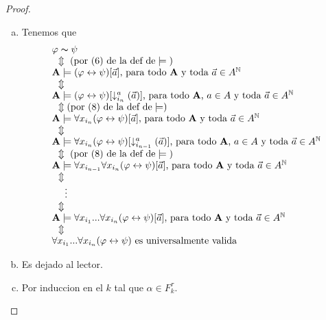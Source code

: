   \begin{proof}
    \begin{enumerate}[(a)]
      \item Tenemos que
        \[
          \begin{array}{l}
            \varphi \thicksim \psi \\
            \ \ \Updownarrow \text{ (por (6) de la def de}\models \text{)} \\
            \mathbf{A} \models (\varphi \leftrightarrow \psi )[\vec{a}]\text{, para todo } \mathbf{A}\text{ y toda }\vec{a}\in A^{\mathbb{N}} \\
            \ \ \Updownarrow \\
            \mathbf{A} \models (\varphi \leftrightarrow \psi )[\downarrow _{i_{n}}^{a}(\vec{a })]\text{, para todo }\mathbf{A}\text{, }a\in A\text{ y toda }\vec{a}\in A^{ \mathbb{N}} \\ \ \ \Updownarrow (\text{por (8) de la def de}\models ) \\ \mathbf{A} \models \forall x_{i_{n}}(\varphi \leftrightarrow \psi )[\vec{a}] \text{, para todo }\mathbf{A}\text{ y toda }\vec{a}\in A^{\mathbb{N}} \\ \ \ \Updownarrow \\ \mathbf{A} \models \forall x_{i_{n}}(\varphi \leftrightarrow \psi )[\downarrow _{i_{n-1}}^{a}(\vec{a})]\text{, para todo }\mathbf{A}\text{, }a\in A\text{ y toda }\vec{a}\in A^{\mathbb{N}} \\ \ \ \Updownarrow \text{ (por (8) de la def de}\models \text{)} \\ \mathbf{A} \models \forall x_{i_{n-1}}\forall x_{i_{n}}(\varphi \leftrightarrow \psi )[\vec{a}]\text{, para todo }\mathbf{A}\text{ y toda }\vec{a}\in A^{ \mathbb{N}} \\ \ \ \Updownarrow \\ \ \ \ \ \vdots \\ \ \ \Updownarrow \\ \mathbf{A} \models \forall x_{i_{1}}...\forall x_{i_{n}}(\varphi \leftrightarrow \psi )[\vec{a}]\text{, para todo }\mathbf{A}\text{ y toda }\vec{a}\in A^{ \mathbb{N}} \\ \ \ \Updownarrow \\ \forall x_{i_{1}}...\forall x_{i_{n}}(\varphi \leftrightarrow \psi )\text{ es universalmente valida}
          \end{array}
        \]
      \item Es dejado al lector.
      \item Por induccion en el $k$ tal que $\alpha \in F_{k}^{\tau }$.
    \end{enumerate}
  \end{proof}

